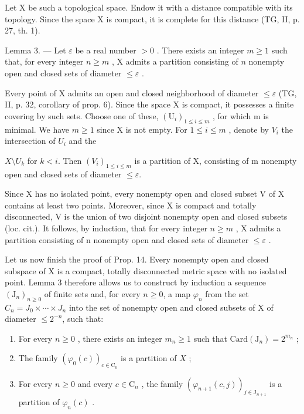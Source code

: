Let X be such a topological space. Endow it with a distance compatible with its topology. Since the space X is compact, it is complete for this distance (TG, II, p. 27, th. 1).

Lemma 3. --- Let \(\varepsilon\) be a real number \(>0\) . There exists an integer \(m \geqslant 1\) such that, for every integer \(n \geqslant m\) , X admits a partition consisting of \(n\) nonempty open and closed sets of diameter \(\leqslant \varepsilon\) .

Every point of X admits an open and closed neighborhood of diameter \(\leqslant\varepsilon\) (TG, II, p. 32, corollary of prop. 6). Since the space X is compact, it possesses a finite covering by such sets. Choose one of these, \((\mathrm{U}_{i})_{1\leqslant i\leqslant m}\) , for which m is minimal. We have \(m\geqslant1\) since X is not empty. For \(1\leqslant i\leqslant m\) , denote by \(V_{i}\) the intersection of \(U_{i}\) and the

\(X\setminus U_k\) for \(k < i\). Then \((V_i)_{1 \leqslant i \leqslant m}\) is a partition of X, consisting of m nonempty open and closed sets of diameter \(\leqslant \varepsilon\).

Since X has no isolated point, every nonempty open and closed subset V of X contains at least two points. Moreover, since X is compact and totally disconnected, V is the union of two disjoint nonempty open and closed subsets (loc. cit.). It follows, by induction, that for every integer \(n \geqslant m\) , X admits a partition consisting of n nonempty open and closed sets of diameter \(\leqslant \varepsilon\) .

Let us now finish the proof of Prop. 14. Every nonempty open and closed subspace of X is a compact, totally disconnected metric space with no isolated point. Lemma 3 therefore allows us to construct by induction a sequence \((\mathrm{J}_{n})_{n\geqslant0}\) of finite sets and, for every \(n\geqslant0\), a map \(\varphi_{n}\) from the set \(C_{n}=J_{0}\times\cdots\times J_{n}\) into the set of nonempty open and closed subsets of X of diameter \(\leqslant2^{-n}\), such that:

\begin{enumerate}
\def\labelenumi{(\roman{enumi})}
\item
  For every \(n \geqslant 0\) , there exists an integer \(m_n \geqslant 1\) such that \(\mathrm{Card}(\mathrm{J}_n) = 2^{m_n}\) ;
\item
  The family \((\varphi_0(c))_{c\in \mathrm{C}_0}\) is a partition of \(X\) ;
\item
  For every \(n \geqslant 0\) and every \(c \in \mathrm{C}_n\) , the family \((\varphi_{n+1}(c,j))_{j \in \mathrm{J}_{n+1}}\) is a partition of \(\varphi_n(c)\) .
\end{enumerate}

